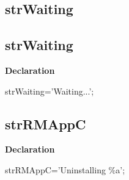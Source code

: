 \documentclass{report}
\newif\ifpdf
\begin{document}
\subsection*{\large{\textbf{strWaiting}}\normalsize\hspace{1ex}\hrulefill}
\else
\subsection*{strWaiting}
\fi
\label{trstrings-strWaiting}
\begin{list}{}{
\setlength{\itemindent}{0cm}
\setlength{\listparindent}{0cm}
\setlength{\leftmargin}{\evensidemargin}
\addtolength{\leftmargin}{\tmplength}
\settowidth{\labelsep}{X}
\addtolength{\leftmargin}{\labelsep}
\setlength{\labelwidth}{\tmplength}
}
\item[\textbf{Declaration}\hfill]
\ifpdf
\begin{flushleft}
\fi
\begin{ttfamily}
strWaiting='Waiting...';\end{ttfamily}

\ifpdf
\end{flushleft}
\fi

\end{list}
\ifpdf
\subsection*{\large{\textbf{strRMAppC}}\normalsize\hspace{1ex}\hrulefill}
\else
\subsection*{strRMAppC}
\fi
\label{trstrings-strRMAppC}
\begin{list}{}{
\setlength{\itemindent}{0cm}
\setlength{\listparindent}{0cm}
\setlength{\leftmargin}{\evensidemargin}
\addtolength{\leftmargin}{\tmplength}
\settowidth{\labelsep}{X}
\addtolength{\leftmargin}{\labelsep}
\setlength{\labelwidth}{\tmplength}
}
\item[\textbf{Declaration}\hfill]
\ifpdf
\begin{flushleft}
\fi
\begin{ttfamily}
strRMAppC='Uninstalling {\%}a';\end{ttfamily}

\ifpdf
\end{flushleft}
\fi

\end{list}
\ifpdf
\end{document}
